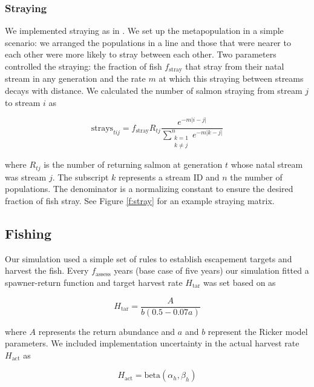 \subsubsection{Straying}

We implemented straying as in \citet{cooper1999}. We set up the
metapopulation in a simple scenario: we arranged the populations in a
line and those that were nearer to each other were more likely to stray
between each other. Two parameters controlled the straying: the fraction
of fish $f_{\mathrm{stray}}$ that stray from their natal stream in any
generation and the rate $m$ at which this straying between streams
decays with distance. We calculated the number of salmon straying from
stream $j$ to stream $i$ as

\begin{equation}
  \mathrm{strays}_{tij} = f_{\mathrm{stray}} R_{tj}
    \frac{e^{-m \lvert i-j \rvert }}
      {\displaystyle\sum\limits_{\substack{k = 1 \\
    k \neq j}}^{n} e^{-m \lvert k-j \rvert }}
  \label{eq:stray}
\end{equation}

\noindent where $R_{tj}$ is the number of returning salmon at generation
$t$ whose natal stream was stream $j$. The subscript $k$ represents a
stream ID and $n$ the number of populations. The denominator is a
normalizing constant to ensure the desired fraction of fish stray. See
Figure \ref{f:stray} for an example straying matrix.

\subsection{Fishing}

Our simulation used a simple set of rules to establish escapement
targets and harvest the fish. Every $f_\mathrm{assess}$ years (base case
of five years) our simulation fitted a spawner-return function and
target harvest rate $H_{\mathrm{tar}}$ was set based on
\citet{hilborn1992} as

\begin{equation}
  H_{\mathrm{tar}} = \frac{A}{b (0.5 - 0.07a)}
  \label{eq:esc}
\end{equation}

\noindent where $A$ represents the return abundance and $a$ and $b$
represent the Ricker model parameters. We included implementation
uncertainty in the actual harvest rate $H_{\mathrm{act}}$ as

\begin{equation}
  H_{\mathrm{act}} = \mathrm{beta}(\alpha_h, \beta_h)
\end{equation}

